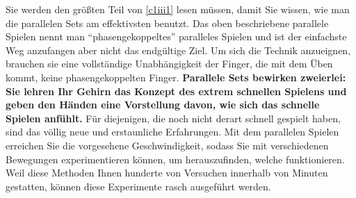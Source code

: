 Sie werden den größten Teil von \hyperref[c1iii1]{\autoref{c1iii1}} lesen müssen, damit Sie wissen, wie man die parallelen Sets am effektivsten benutzt.
Das oben beschriebene parallele Spielen nennt man \enquote{phasengekoppeltes} paralleles Spielen und ist der einfachste Weg anzufangen aber nicht das endgültige Ziel.
Um sich die Technik anzueignen, brauchen sie eine vollständige Unabhängigkeit der Finger, die mit dem Üben kommt, keine phasengekoppelten Finger.
\textbf{Parallele Sets bewirken zweierlei: Sie lehren Ihr Gehirn das Konzept des extrem schnellen Spielens und geben den Händen eine Vorstellung davon, wie sich das schnelle Spielen anfühlt.}
Für diejenigen, die noch nicht derart schnell gespielt haben, sind das völlig neue und erstaunliche Erfahrungen.
Mit dem parallelen Spielen erreichen Sie die vorgesehene Geschwindigkeit, sodass Sie mit verschiedenen Bewegungen experimentieren können, um herauszufinden, welche funktionieren.
Weil diese Methoden Ihnen hunderte von Versuchen innerhalb von Minuten gestatten, können diese Experimente rasch ausgeführt werden.
 


